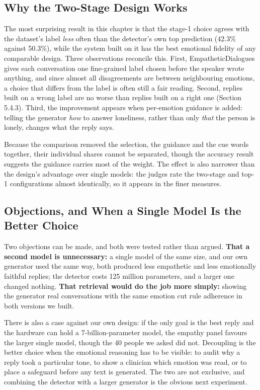 \subsection{Why the Two-Stage Design Works}
\label{sec:5.6.2}

The most surprising result in this chapter is that the stage-1 choice agrees with the dataset's label \textit{less} often than the detector's own top prediction (42.3\% against 50.3\%), while the system built on it has the best emotional fidelity of any comparable design. Three observations reconcile this. First, EmpatheticDialogues gives each conversation one fine-grained label chosen before the speaker wrote anything, and since almost all disagreements are between neighbouring emotions, a choice that differs from the label is often still a fair reading. Second, replies built on a wrong label are no worse than replies built on a right one (Section 5.4.3). Third, the improvement appears when per-emotion guidance is added: telling the generator \textit{how} to answer loneliness, rather than only \textit{that} the person is lonely, changes what the reply says.

Because the comparison removed the selection, the guidance and the cue words together, their individual shares cannot be separated, though the accuracy result suggests the guidance carries most of the weight. The effect is also narrower than the design's advantage over single models: the judges rate the two-stage and top-1 configurations almost identically, so it appears in the finer measures.

\subsection{Objections, and When a Single Model Is the Better Choice}
\label{sec:5.6.3}

Two objections can be made, and both were tested rather than argued. \textbf{That a second model is unnecessary: }a single model of the same size, and our own generator used the same way, both produced less empathetic and less emotionally faithful replies; the detector costs 125 million parameters, and a larger one changed nothing. \textbf{That retrieval would do the job more simply:} showing the generator real conversations with the same emotion \cite{lewis2020rag} cut rule adherence in both versions we built.

There is also a case against our own design: if the only goal is the best reply and the hardware can hold a 7-billion-parameter model, the empathy panel favours the larger single model, though the 40 people we asked did not. Decoupling is the better choice when the emotional reasoning has to be visible: to audit why a reply took a particular tone, to show a clinician which emotion was read, or to place a safeguard before any text is generated. The two are not exclusive, and combining the detector with a larger generator is the obvious next experiment.

